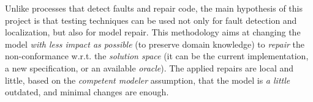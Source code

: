 \documentclass [a4paper, 12pt, twoside]{report}
\theoremstyle{plain}
\theoremstyle{definition}
\theoremstyle{remark}
\theoremstyle{plain}
\theoremstyle{plain}
\theoremstyle{remark}
\begin{document}
Unlike processes that detect faults and repair code, %
the main hypothesis of this project is that testing techniques can be used not only for fault detection and localization, but also for model repair.
This methodology aims at changing the model \textit{with less impact as possible} (to preserve domain knowledge) to \textit{repair} the non-conformance w.r.t. the \textit{solution space} (it can be the current implementation, a new specification, or an available \textit{oracle}).
The applied repairs are local and little, based on the \textit{competent modeler} assumption, that the model is \textit{a little} outdated, and minimal changes are enough. 



\end{document}
